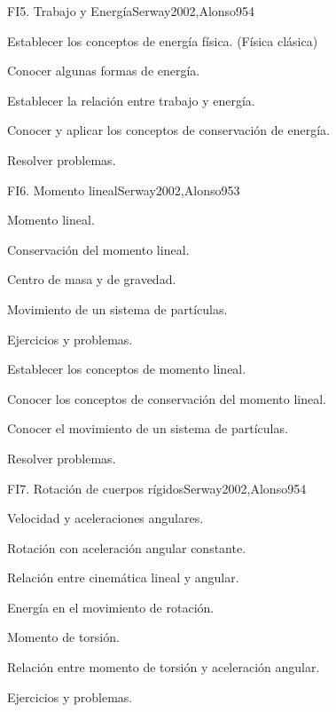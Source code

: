 \begin{syllabus}
\begin{unit}{FI5. Trabajo y Energía}{Serway2002,Alonso95}{4}
   \begin{learningoutcomes}
      \item Establecer los conceptos de energía física. (Física clásica)
      \item Conocer algunas formas de energía.
      \item Establecer la relación entre trabajo y energía.
      \item Conocer y aplicar los conceptos de conservación de energía.
      \item Resolver problemas.
   \end{learningoutcomes}
\end{unit}

\begin{unit}{FI6. Momento lineal}{Serway2002,Alonso95}{3}
\begin{topics}
      \item Momento lineal.
      \item Conservación del momento lineal.
      \item Centro de masa y de gravedad.
      \item Movimiento de un sistema de partículas.
      \item Ejercicios y problemas.
  \end{topics}

   \begin{learningoutcomes}
      \item Establecer los conceptos de momento lineal.
      \item Conocer los conceptos de conservación del momento lineal.
      \item Conocer el movimiento de un sistema de partículas.
      \item Resolver problemas.
   \end{learningoutcomes}
\end{unit}

\begin{unit}{FI7. Rotación de cuerpos rígidos}{Serway2002,Alonso95}{4}
\begin{topics}
      \item Velocidad y aceleraciones angulares.
      \item Rotación con aceleración angular constante.
      \item Relación entre cinemática lineal y angular.
      \item Energía en el movimiento de rotación.
      \item Momento de torsión.
      \item Relación entre momento de torsión y aceleración angular.
      \item Ejercicios y problemas.
   \end{topics}


\end{unit}
\end{syllabus}
